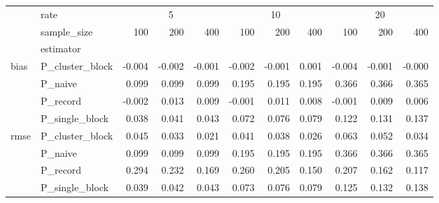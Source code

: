 \begin{tabular}{llrrrrrrrrr}
\toprule
{} & {rate} & \multicolumn{3}{c}{5} & \multicolumn{3}{c}{10} & \multicolumn{3}{c}{20} \\
{} & {sample_size} & {100} & {200} & {400} & {100} & {200} & {400} & {100} & {200} & {400} \\
{} & {estimator} & {} & {} & {} & {} & {} & {} & {} & {} & {} \\
\midrule
\multirow[c]{4}{*}{bias} & P_cluster_block & -0.004 & -0.002 & -0.001 & -0.002 & -0.001 & 0.001 & -0.004 & -0.001 & -0.000 \\
 & P_naive & 0.099 & 0.099 & 0.099 & 0.195 & 0.195 & 0.195 & 0.366 & 0.366 & 0.365 \\
 & P_record & -0.002 & 0.013 & 0.009 & -0.001 & 0.011 & 0.008 & -0.001 & 0.009 & 0.006 \\
 & P_single_block & 0.038 & 0.041 & 0.043 & 0.072 & 0.076 & 0.079 & 0.122 & 0.131 & 0.137 \\
\multirow[c]{4}{*}{rmse} & P_cluster_block & 0.045 & 0.033 & 0.021 & 0.041 & 0.038 & 0.026 & 0.063 & 0.052 & 0.034 \\
 & P_naive & 0.099 & 0.099 & 0.099 & 0.195 & 0.195 & 0.195 & 0.366 & 0.366 & 0.365 \\
 & P_record & 0.294 & 0.232 & 0.169 & 0.260 & 0.205 & 0.150 & 0.207 & 0.162 & 0.117 \\
 & P_single_block & 0.039 & 0.042 & 0.043 & 0.073 & 0.076 & 0.079 & 0.125 & 0.132 & 0.138 \\
\bottomrule
\end{tabular}
